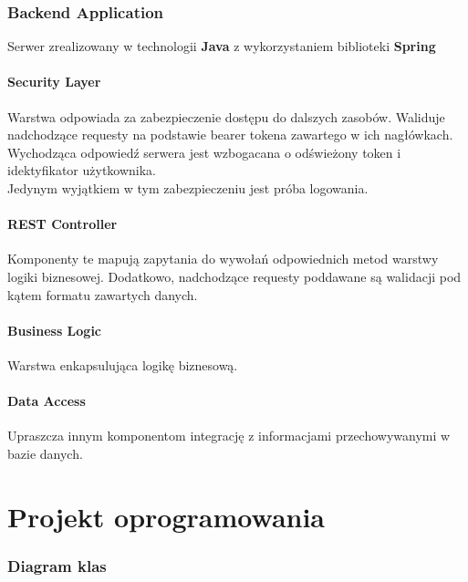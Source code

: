 \documentclass{scrreprt}
\begin{document}
\subsection{Backend Application}
Serwer zrealizowany w technologii \textbf{Java} z wykorzystaniem biblioteki \textbf{Spring}

\subsubsection{Security Layer}
Warstwa odpowiada za zabezpieczenie dostępu do dalszych zasobów. 
Waliduje nadchodzące requesty na podstawie bearer tokena zawartego w ich nagłówkach.
Wychodząca odpowiedź serwera jest wzbogacana o odświeżony token i idektyfikator użytkownika.\\
Jedynym wyjątkiem w tym zabezpieczeniu jest próba logowania.

\subsubsection{REST Controller}
Komponenty te mapują zapytania do wywołań odpowiednich metod warstwy logiki biznesowej. 
Dodatkowo, nadchodzące requesty poddawane są walidacji pod kątem formatu zawartych danych.

\subsubsection{Business Logic}
Warstwa enkapsulująca logikę biznesową.

\subsubsection{Data Access}
Upraszcza innym komponentom integrację z informacjami przechowywanymi w bazie danych. 


\chapter{Projekt oprogramowania}

\subsection{Diagram klas}
\end{document}
